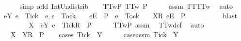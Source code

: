 \begin{isabellebody}
\ \ \ \ \isamarkupfalse%
\ {\isacharparenleft}simp\ add{\isacharcolon}\ Int{\isacharunderscore}Un{\isacharunderscore}distrib{\isacharparenright}\isanewline
\ \ \isamarkupfalse%
\ TT{}w{\isacharunderscore}P{\isacharcolon}\ {\isachardoublequoteopen}TT{}w\ P{\isachardoublequoteclose}\isanewline
\ \ \ \ \isamarkupfalse%
\ assm{}\ TT{\isacharunderscore}TT{}w\ \isamarkupfalse%
\ auto\isanewline
\ \ \isamarkupfalse%
\ {\isachardoublequoteopen}{\isacharbraceleft}e{\isasymin}Y{\isachardot}\ e\ {\isasymnoteq}\ Tick{\isacharbraceright}\ {\isasyminter}\ {\isacharbraceleft}e{\isachardot}\ e\ {\isasymnoteq}\ Tock\ {\isasymand}\ {\isasymrho}\ {\isacharat}\ {\isacharbrackleft}{\isacharbrackleft}e{\isacharbrackright}\isactrlsub E{\isacharbrackright}\ {\isasymin}\ P\ {\isasymor}\ e\ {\isacharequal}\ Tock\ {\isasymand}\ {\isasymrho}\ {\isacharat}\ {\isacharbrackleft}{\isacharbrackleft}X{\isacharbrackright}\isactrlsub R{\isacharcomma}\ {\isacharbrackleft}e{\isacharbrackright}\isactrlsub E{\isacharbrackright}\ {\isasymin}\ P{\isacharbraceright}\ {\isacharequal}\ {\isacharbraceleft}{\isacharbraceright}{\isachardoublequoteclose}\isanewline
\ \ \ \ \isamarkupfalse%
\ {}\ \isamarkupfalse%
\ blast\isanewline
\ \ \isamarkupfalse%
\ \isamarkupfalse%
\ {}{\isacharcolon}\ {\isachardoublequoteopen}{\isasymrho}\ {\isacharat}\ {\isacharbrackleft}{\isacharbrackleft}X\ {\isasymunion}\ {\isacharbraceleft}e{\isasymin}Y{\isachardot}\ e\ {\isasymnoteq}\ Tick{\isacharbraceright}{\isacharbrackright}\isactrlsub R{\isacharbrackright}\ {\isasymin}\ P{\isachardoublequoteclose}\isanewline
\ \ \ \ \isamarkupfalse%
\ TT{}w{\isacharunderscore}P\ assm{}\ \isamarkupfalse%
\ TT{}w{\isacharunderscore}def\ \isamarkupfalse%
\ auto\isanewline
\ \ \isamarkupfalse%
\ {\isachardoublequoteopen}{\isasymrho}\ {\isacharat}\ {\isacharbrackleft}{\isacharbrackleft}X\ {\isasymunion}\ Y{\isacharbrackright}\isactrlsub R{\isacharbrackright}\ {\isasymin}\ P{\isachardoublequoteclose}\isanewline
\ \ \isamarkupfalse%
\ {\isacharparenleft}cases\ {\isachardoublequoteopen}Tick\ {\isasymin}\ Y{\isachardoublequoteclose}{\isacharparenright}\isanewline
\ \ \ \ \isamarkupfalse%
\ case{\isacharunderscore}assm{\isacharcolon}\ {\isachardoublequoteopen}Tick\ {\isasymin}\ Y{\isachardoublequoteclose}\isanewline

\end{isabellebody}
